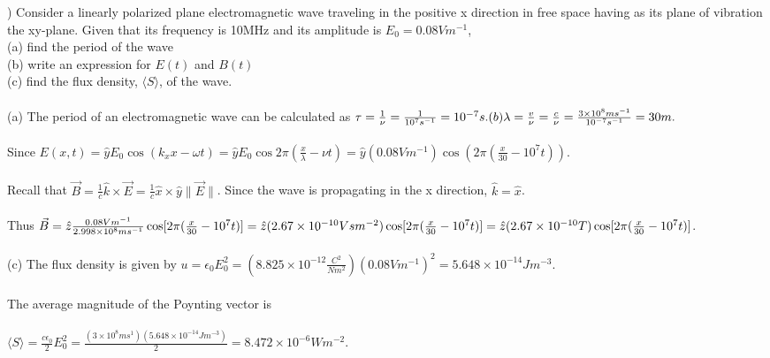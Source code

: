 \documentclass[12pt]{article}
\begin{document}
) Consider a linearly polarized plane electromagnetic 
wave traveling in the positive x direction in free space having as its plane 
of vibration the xy-plane. Given that its frequency is 10MHz and its amplitude 
is $E_{0} = 0.08Vm^{-1}$, \\
(a) find the period of the wave\\
(b) write an expression for $E(t)$ and $B(t)$\\
(c) find the flux density, $\langle S \rangle$, of the wave.\\\\

\noindent (a) The period of an electromagnetic wave can be calculated as 
$\tau = \frac{1}{\nu} =\frac{1}{10^{7}s^{-1}} = 10^{-7}s.\\\\
\noindent (b) \lambda = \frac{v}{\nu} = \frac{c}{\nu} 
= \frac{3\times10^{8}ms^{-1}}{10^{-7}s^{-1}} = 30m.$\\\\
Since $E(x,t) = \hat{y}E_{0}\cos(k_{x}x-\omega t) 
= \hat{y}E_{0}\cos2\pi(\frac{x}{\lambda}-\nu t)
= \hat{y}(0.08Vm^{-1})\cos(2\pi(\frac{x}{30}-10^{7}t))$.\\\\

\noindent Recall that $\vec{B} = \frac{1}{c}\hat{k} \times \vec{E} 
=\frac{1}{c}\hat{x}\times\hat{y}\| \vec{E} \|$. Since the wave is 
propagating in the x direction, $\hat{k} = \hat{x}$. \\\\Thus
$\vec{B} = \hat{z}\frac{0.08Vm^{-1}}{2.998\times 10^{8}ms^{-1}}
\cos[2\pi(\frac{x}{30}-10^{7}t)] 
\\\\= \hat{z}(2.67\times10^{-10}Vsm^{-2})\cos[2\pi(\frac{x}{30}-10^{7}t)]
\\\\=\hat{z}(2.67\times10^{-10}T)\cos[2\pi(\frac{x}{30}-10^{7}t)]$.\\\\

\noindent (c) The flux density is given by $u = \epsilon_{0}E_{0}^{2}
=(8.825\times10^{-12}\frac{C^{2}}{Nm^{2}})(0.08Vm^{-1})^{2} = 5.648\times10^{-14}Jm^{-3}$.\\\\
\noindent The average magnitude of the Poynting vector is 
\\\\$\langle S \rangle = \frac{c\epsilon_{0}}{2}E_{0}^{2} 
= \frac{(3\times10^{8}ms^{1})(5.648\times10^{-14}Jm^{-3})}{2} 
= 8.472\times10^{-6}Wm^{-2}$.
\end{document}
